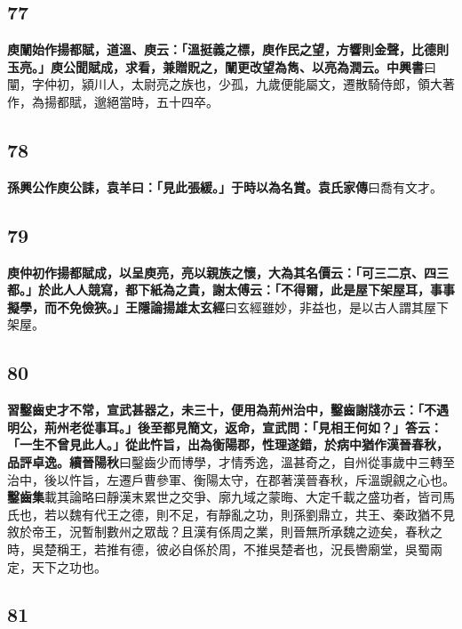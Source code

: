 \subsection*{77}

\textbf{庾闡始作揚都賦，道溫、庾云：「溫挺義之標，庾作民之望，方響則金聲，比德則玉亮。」庾公聞賦成，求看，兼贈貺之，闡更改望為雋、以亮為潤云。}{\footnotesize \textbf{中興書}曰闡，字仲初，潁川人，太尉亮之族也，少孤，九歲便能屬文，遷散騎侍郎，領大著作，為揚都賦，邈絕當時，五十四卒。}

\subsection*{78}

\textbf{孫興公作庾公誄，袁羊曰：「見此張緩。」于時以為名賞。}{\footnotesize \textbf{袁氏家傳}曰喬有文才。}

\subsection*{79}

\textbf{庾仲初作揚都賦成，以呈庾亮，亮以親族之懷，大為其名價云：「可三二京、四三都。」於此人人競寫，都下紙為之貴，謝太傅云：「不得爾，此是屋下架屋耳，事事擬學，而不免儉狹。」}{\footnotesize \textbf{王隱論揚雄太玄經}曰玄經雖妙，非益也，是以古人謂其屋下架屋。}

\subsection*{80}

\textbf{習鑿齒史才不常，宣武甚器之，未三十，便用為荊州治中，鑿齒謝牋亦云：「不遇明公，荊州老從事耳。」後至都見簡文，返命，宣武問：「見相王何如？」答云：「一生不曾見此人。」從此忤旨，出為衡陽郡，性理遂錯，於病中猶作漢晉春秋，品評卓逸。}{\footnotesize \textbf{續晉陽秋}曰鑿齒少而博學，才情秀逸，溫甚奇之，自州從事歲中三轉至治中，後以忤旨，左遷戶曹參軍、衡陽太守，在郡著漢晉春秋，斥溫覬覦之心也。\textbf{鑿齒集}載其論略曰靜漢末累世之交爭、廓九域之蒙晦、大定千載之盛功者，皆司馬氏也，若以魏有代王之德，則不足，有靜亂之功，則孫劉鼎立，共王、秦政猶不見敘於帝王，況暫制數州之眾哉？且漢有係周之業，則晉無所承魏之迹矣，春秋之時，吳楚稱王，若推有德，彼必自係於周，不推吳楚者也，況長轡廟堂，吳蜀兩定，天下之功也。}

\subsection*{81}

